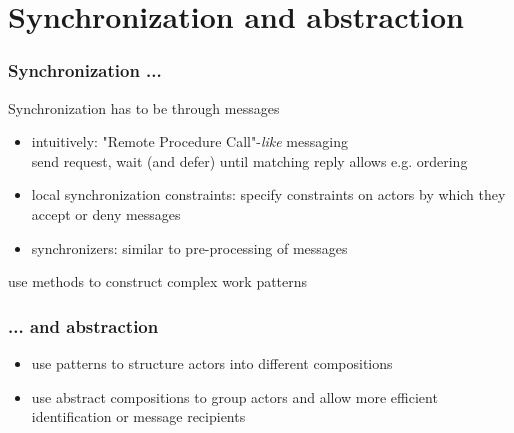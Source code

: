 \section{Synchronization and abstraction}
\begin{frame}
\frametitle{Synchronization ...}
Synchronization has to be through messages
\begin{itemize}
\item intuitively: "Remote Procedure Call"-{\it like} messaging\\
send request, wait (and defer) until matching reply \textrightarrow allows e.g. ordering
\item local synchronization constraints: specify constraints on actors by which they accept or deny messages
\item synchronizers: similar to pre-processing of messages
\end{itemize}
\textrightarrow use methods to construct complex work patterns
\end{frame}

\begin{frame}
\frametitle{... and abstraction}
\begin{itemize}
\item use patterns to structure actors into different compositions
\item use abstract compositions to group actors and allow more efficient identification or message recipients
\end{itemize}
\end{frame}